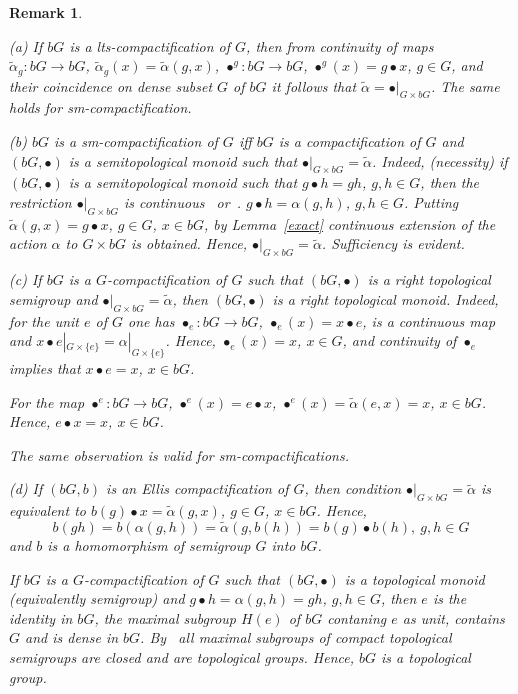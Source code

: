 \documentclass{amsart}
\newtheorem{rem}[thm]{Remark}
\begin{document}
\begin{rem}\label{tscomp}
{\rm (a) If $b G$ is a lts-compactification of $G$, then from continuity of maps $\tilde\alpha_g: b G\to b G$, $\tilde\alpha_g(x)=\tilde\alpha (g, x)$, $\bullet^g: b G\to b G$, $\bullet^g (x)=g\bullet  x$, $g\in G$, and their coincidence on dense subset $G$ of $b G$ it follows that $\tilde\alpha=\bullet |_{G\times b G}$. The same holds for sm-compactification.

\medskip

(b) $b G$ is a sm-compactification of $G$ iff  $b G$ is a compactification of $G$ and $(bG, \bullet)$ is a semitopological monoid such that  $\bullet|_{G\times b G}=\tilde\alpha$. Indeed, (necessity) if $(bG, \bullet)$ is a semitopological monoid such that $g\bullet h=gh$, $g, h\in G$, then the restriction $\bullet|_{G\times b G}$ is continuous~\cite[Propositions 6.1, 6.2]{JLawson} or~\cite[Theorem 2.38]{HS}.  $g\bullet h=\alpha (g, h)$, $g, h\in G$. Putting $\tilde\alpha (g, x)=g\bullet x$, $g\in G$, $x\in b G$, by Lemma~\ref{exact} continuous extension of the action $\alpha$ to $G\times b G$ is obtained. Hence, $\bullet|_{G\times b G}=\tilde\alpha$. Sufficiency is evident.

\medskip

(c) If $b G$ is a $G$-compactification of $G$ such that $(bG, \bullet)$ is a right topological semigroup and $\bullet|_{G\times b G}=\tilde\alpha$, then $(bG, \bullet)$ is a right topological monoid. Indeed, for the unit $e$ of $G$ one has $\bullet_{e}: b G\to b G$, $\bullet_{e}(x)=x\bullet e$, is a continuous map and $x\bullet e|_{G\times\{e\}}=\alpha|_{G\times\{e\}}$. Hence, $\bullet_{e}(x)=x$, $x\in G$, and continuity of $\bullet_{e}$ implies that $x\bullet e=x$, $x\in b G$. 

For the map $\bullet^{e}: b G\to b G$, $\bullet^{e}(x)=e\bullet x$, $\bullet^{e}(x)=\tilde\alpha (e, x)=x$, $x\in b G$. Hence, $e\bullet x=x$, $x\in b G$. 

The same observation is valid for sm-compactifications.

\medskip

(d) If $(b G, b)$ is an Ellis compactification of $G$, then condition $\bullet|_{G\times b G}=\tilde\alpha$ is equivalent to $b(g)\bullet x=\tilde\alpha (g, x)$, $g\in G$, $x\in b G$. Hence, $$b(gh)=b(\alpha (g, h))=\tilde\alpha (g, b(h))=b(g)\bullet b(h),\ g, h\in G$$ and $b$ is a homomorphism of semigroup $G$ into $b G$.

\medskip

If $b G$ is a $G$-compactification of $G$ such that $(bG, \bullet)$ is a topological monoid (equivalently semigroup) and $g\bullet h=\alpha (g, h)=gh$, $g, h\in G$, then $e$ is the identity in $b G$, the maximal subgroup $H(e)$ of $b G$ contaning $e$ as unit, contains $G$ and is dense in $b G$. By~\cite[Theorem 2.32]{HS} all maximal subgroups of compact topological semigroups are closed and are topological groups. Hence, $b G$ is a topological group.}
\end{rem}
\end{document}
